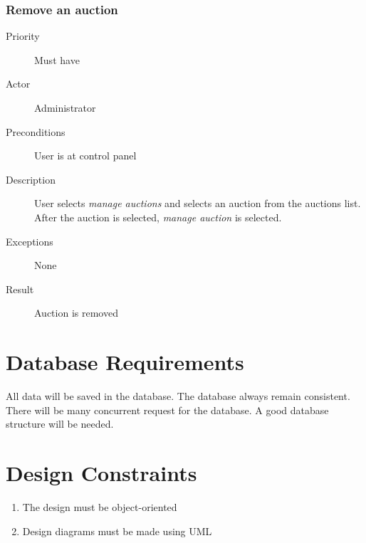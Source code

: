 \documentclass[a4paper, 12pt]{report}
\begin{document}
		\subsubsection{Remove an auction}
			\begin{description}
				\item[Priority] Must have
				\item[Actor] Administrator
				\item[Preconditions] User is at control panel
				\item[Description] User selects \emph{manage auctions} and selects an auction from the auctions 
				list. After the auction is selected, \emph{manage auction} is selected.
				\item[Exceptions] None
				\item[Result] Auction is removed
			\end{description}	
\section{Database Requirements}
	All data will be saved in the database. The database always remain consistent. There will be many concurrent request 
	for the database. A good database structure will be needed. 
\section{Design Constraints}
	\begin{enumerate}
		\item The design must be object-oriented
		\item Design diagrams must be made using UML
	\end{enumerate}

\end{document}
